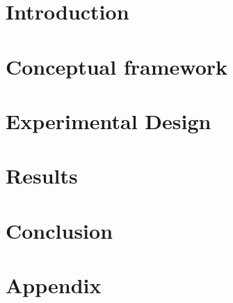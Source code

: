 \documentclass[12pt,a4paper]{article}
\begin{document}
\maketitle



\vspace{0.3cm}


\newpage


\section{Introduction}
\label{sec:Introduction}


\section{Conceptual framework}
\label{sec:Conceptual_framework}


\section{Experimental Design}
\label{sec:Experimental_design}


%

\section{Results}
\label{section:Results}


\section{Conclusion}
%

\section{Appendix}


\newpage

\printbibliography
\end{document}
